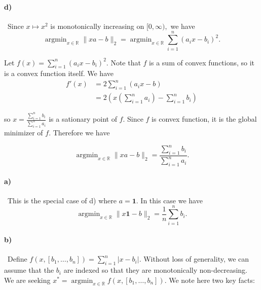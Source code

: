 \documentclass[a4paper,12pt]{article}
\begin{document}
\paragraph{d)}
\
Since $x\mapsto x^2$ is monotonically increasing on $[0,\infty),$ we have $$\operatorname{argmin}_{x\in \mathbb{R}} \| xa - b \|_2 = \operatorname{argmin}_{x\in \mathbb{R}} \sum_{i=1}^n ( a_i x - b_i)^2.$$

Let $f(x) = \sum_{i=1}^n (a_i x - b_i)^2.$ Note that $f$ is a sum of convex functions, so it is a convex function itself. We have 
\begin{align*}
 f'(x) &= 2 \sum_{i=1}^n (a_i x-b) \\
       &= 2\left( x \left(\sum_{i=1}^n a_i\right) - \sum_{i=1}^n b_i \right)
\end{align*}

so $\displaystyle x = \frac{ \sum_{i=1}^n b_i }{\sum_{i=1}^n a_i}$ is a sationary point of $f.$ Since $f$ is convex function, it is the global minimizer of $f.$ Therefore we have 

$$ \operatorname{argmin}_{x\in \mathbb{R}} \| xa - b \|_2 = \frac{ \sum_{i=1}^n b_i }{\sum_{i=1}^n a_i}.$$

\paragraph{a)}
\
This is the special case of d) where $a = \mathbf{1}.$ In this case we have  
$$ \operatorname{argmin}_{x\in \mathbb{R}} \| x\mathbf{1} - b \|_2 = \frac{1}{n}\sum_{i=1}^n b_i .$$

\paragraph{b)}
\
Define $f(x, [b_1,\ldots, b_n]) = \sum_{i=1}^n |x - b_i|.$ Without loss of generality, we can assume that the $b_i$ are indexed so that they are monotonically non-decreasing. We are seeking $x^* = \operatorname{argmin}_{x\in \mathbb{R}} f(x, [b_1, \ldots, b_n]).$ We note here two key facts:\\
\end{document}
